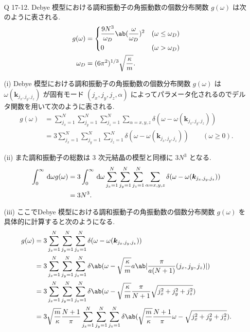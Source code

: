 \documentclass[uplatex,dvipdfmx,a4paper,11pt]{jlreq}
\numberwithin{equation}{section}
\theoremstyle{definition}
\begin{document}
\begin{itembox}[l]{Q 17-12.}
  Debye 模型における調和振動子の角振動数の個数分布関数 $g(\omega)$ は次のように表される.
  \begin{align}
    g(\omega) & = \begin{dcases}
                    \frac{9N^3}{\omega_D}\ab(\frac{\omega}{\omega_D})^2 & (\omega\leq\omega_D) \\
                    0                                                   & (\omega > \omega_D)
                  \end{dcases} \\
    \omega_D  & = (6\pi^2)^{1/3}\sqrt{\frac{\kappa}{m}}.
  \end{align}
\end{itembox}

(i) Debye 模型における調和振動子の角振動数の個数分布関数 $g(\omega)$ は $\omega(\bm{k}_{j_x, j_y, j_z})$ が固有モード $(j_x, j_y, j_z, \alpha)$ によってパラメータ化されるのでデルタ関数を用いて次のように表される.
\begin{align}
  g(\omega) & = \sum_{j_x=1}^{N}\sum_{j_y=1}^{N}\sum_{j_z=1}^{N}\sum_{\alpha=x,y,z}\delta(\omega - \omega(\bm{k}_{j_x,j_y,j_z}))      \\
            & = 3\sum_{j_x=1}^{N}\sum_{j_y=1}^{N}\sum_{j_z=1}^{N}\delta(\omega - \omega(\bm{k}_{j_x,j_y,j_z})) \qquad (\omega\geq 0).
\end{align}

(ii) また調和振動子の総数は 3 次元結晶の模型と同様に $3N^3$ となる.
\begin{align}
  \int_0^\infty\dl{\omega}g(\omega) & = 3\int_0^\infty\dl{\omega}\sum_{j_x=1}^{N}\sum_{j_y=1}^{N}\sum_{j_z=1}^{N}\sum_{\alpha=x,y,z}\delta(\omega - \omega(\bm{k}_{j_x,j_y,j_z})) \\
                                    & = 3N^3.
\end{align}

(iii) ここでDebye 模型における調和振動子の角振動数の個数分布関数 $g(\omega)$ を具体的に計算すると次のようになる.
\begin{align}
  g(\omega) & = 3\sum_{j_x=1}^{N}\sum_{j_y=1}^{N}\sum_{j_z=1}^{N}\delta(\omega - \omega(\bm{k}_{j_x,j_y,j_z}))                                                                                 \\
            & = 3\sum_{j_x=1}^{N}\sum_{j_y=1}^{N}\sum_{j_z=1}^{N}\delta\ab(\omega - \sqrt{\frac{\kappa}{m}}a\ab|\frac{\pi}{a(N+1)}(j_x,j_y,j_z)|)                                              \\
            & = 3\sum_{j_x=1}^{N}\sum_{j_y=1}^{N}\sum_{j_z=1}^{N}\delta\ab(\omega - \sqrt{\frac{\kappa}{m}}\frac{\pi}{N+1}\sqrt{j_x^2 + j_y^2 + j_z^2})                                        \\
            & = 3\sqrt{\frac{m}{\kappa}}\frac{N+1}{\pi}\sum_{j_x=1}^{N}\sum_{j_y=1}^{N}\sum_{j_z=1}^{N}\delta\ab(\sqrt{\frac{m}{\kappa}}\frac{N+1}{\pi}\omega - \sqrt{j_x^2 + j_y^2 + j_z^2}).
\end{align}
\end{document}
